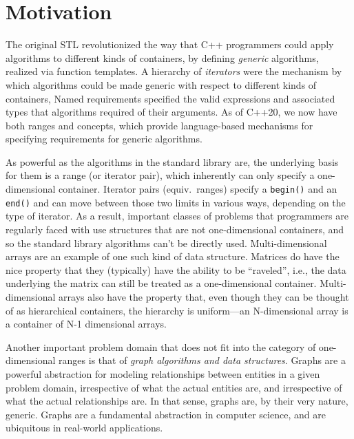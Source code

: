

\section{Motivation}

The original STL revolutionized the way that C++ programmers could apply algorithms to different kinds of containers, by defining \emph{generic} algorithms, realized via function templates.  
A hierarchy of \emph{iterators} were the mechanism by which algorithms could be made generic with respect to different kinds of containers,
Named requirements specified the valid expressions and associated types that algorithms required of their arguments.  As of C++20, we now have both ranges and concepts, which
provide language-based mechanisms for specifying requirements for generic algorithms.

As powerful as the algorithms in the standard library are, the underlying basis for them is a range (or iterator pair), which inherently can only specify a one-dimensional container.  
Iterator pairs (equiv.\ ranges) specify a \lstinline{begin()} and an \lstinline{end()} and can move between those two limits in various ways, depending on the type of iterator.
As a result, important classes of problems that programmers are regularly faced with use structures that are not one-dimensional containers, and so the standard library algorithms can't be directly used.
Multi-dimensional arrays are an example of one such kind of data structure. Matrices do have the nice property that they (typically) have the ability to be ``raveled'', i.e., the data underlying the matrix can still be treated as a one-dimensional container.  Multi-dimensional arrays also have the property that, even though they can be thought of as hierarchical containers, the hierarchy is uniform---an N-dimensional array is a container of N-1 dimensional arrays.

Another important problem domain that does not fit into the category of one-dimensional ranges is that of \emph{graph algorithms and data structures}.
Graphs are a powerful abstraction for modeling relationships between entities in a given problem domain,
irrespective of what the actual entities are, and irrespective of what the actual relationships are.
In that sense, graphs are, by their very nature, generic.
Graphs are a fundamental abstraction in computer science, and are ubiquitous in real-world applications.

